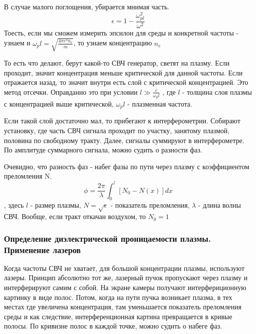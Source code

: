 \documentclass[10pt, a4paper]{article}
\numberwithin{equation}{section}
\begin{document}
В случае малого поглощения, убирается мнимая часть.
\begin{equation}
	\epsilon = 1- \frac{\omega_{pl}^{2}}{\omega^{2}} 
\end{equation} 
Тоесть, если мы сможем измерить эпсилон для среды и конкретной частоты - узнаем и $\omega_pl = \sqrt{\frac{4 \pi e^{2} n_e}{m}}$, то узнаем концентрацию $n_e$

То есть что делают, берут какой-то СВЧ генератор, светят на плазму. Если проходит, значит концентрация меньше критической для данной частоты. Если отражается назад, то значит внутри есть слой с критической концентрацией. Это метод отсечки.
Оправданно это при условии $l \gg \frac{c}{\omega_pl}$
, где $l$ - толщина слоя плазмы с концентрацией выше критической, $\omega_pl$ - плазменная частота.

Если такой слой достаточно мал, то прибегают к интерферометрии. Собирают установку, где часть СВЧ сигнала проходит по участку, занятому плазмой, половина по свободному тракту. Далее, сигналы суммируют в интерферометре. По амплитуде суммарного сигнала, можно судить о разности фаз.
 
\begin{figure}[h!]
\end{figure}
 
 Очевидно, что разность фаз - набег фазы по пути через плазму с коэффициентом преломления N.
 \begin{equation}
 	\phi = \frac{2 \pi}{\lambda} \int_{0}^{l} [N_0 - N(x)] dx 
 \end{equation} 
, здесь $l$ - размер плазмы, $N=\sqrt{\epsilon}$ - показатель преломления, $\lambda$ - длина волны СВЧ. Вообще, если тракт откачан воздухом, то $N_0 =1$


\subsubsection{Определение диэлектрической проницаемости плазмы. Применение лазеров}
\label{11.5}
Когда частоты СВЧ не хватает, для большой концентрации плазмы, используют лазеры.
Принцип абсолютно тот же, лазерный пучок пропускают через плазму и интерферируют самим с собой. На экране камеры получают интерфериционную картинку в виде полос. Потом, когда на пути пучка возникает плазма, в тех местах где увеличена концентрация, там уменьшается показатель преломления среды и как следствие, интерференционная картина превращается в кривые полосы. По кривизне полос в каждой точке, можно судить о набеге фаз.
\end{document}
